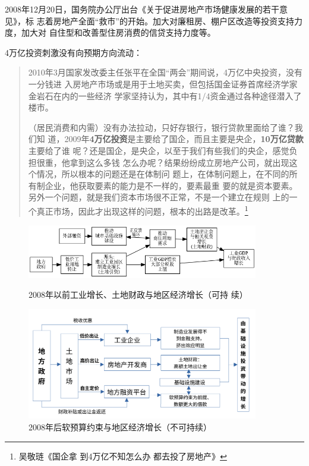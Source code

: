 2008年12月20日，国务院办公厅出台《关于促进房地产市场健康发展的若干意见》，标
志着房地产全面“救市”的开始。加大对廉租房、棚户区改造等投资支持力度，加大对
自住型和改善型住房消费的信贷支持力度等。

4万亿投资刺激没有向预期方向流动：
\begin{quotation}
2010年3月国家发改委主任张平在全国“两会”期间说，4万亿中央投资，没有一分钱进
入房地产市场或是用于土地买卖，但包括国金证券首席经济学家金岩石在内的一些经济
学家坚持认为，其中有1/4资金通过各种途径潜入了楼市。\cite{2011feiteng}

（居民消费和内需）没有办法拉动，只好存银行，银行贷款里面给了谁？我们知
道，2009年\textbf{4万亿投资}是主要给了国企，而且主要是央企，\textbf{10万亿贷款}主要给了谁
呢？还是国企，是央企，以至于我们有些我们的央企，感觉负担很重，他拿到这么多钱
怎么办呢？结果纷纷成立房地产公司，就出现这个情况，所以根本的问题还是在体制问
题上，在体制问题上，在不同的所有制企业，他获取要素的能力是不一样的，要素最重
要的就是资本要素。另外一个问题，就是我们资本市场很不正常，不是一个建立在规则
上的一个真正市场，因此才出现这样的问题，根本的出路是改革。\footnote{吴敬琏《国企拿
  到4万亿不知怎么办 都去投了房地产》}
\end{quotation}

\begin{figure}[htbp!]
  \centering
  \includegraphics[width=0.9\textwidth]{figures/before08.png}
  \caption{\label{fig:bf08}2008年以前工业增长、土地财政与地区经济增长（可持
    续） }

  \includegraphics[width=0.9\textwidth]{figures/after08.pdf}
  \caption{\label{fig:af08}2008年后软预算约束与地区经济增长（不可持续） }
\end{figure}

